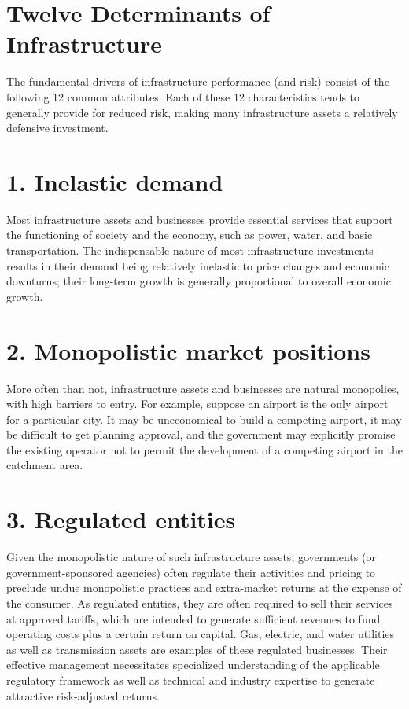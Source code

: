 \documentclass[11pt]{article}
\begin{document}
\section*{Twelve Determinants of Infrastructure}
The fundamental drivers of infrastructure performance (and risk) consist of the following 12 common attributes. Each of these 12 characteristics tends to generally provide for reduced risk, making many infrastructure assets a relatively defensive investment.

\section*{1. Inelastic demand}
Most infrastructure assets and businesses provide essential services that support the functioning of society and the economy, such as power, water, and basic transportation. The indispensable nature of most infrastructure investments results in their demand being relatively inelastic to price changes and economic downturns; their long-term growth is generally proportional to overall economic growth.

\section*{2. Monopolistic market positions}
More often than not, infrastructure assets and businesses are natural monopolies, with high barriers to entry. For example, suppose an airport is the only airport for a particular city. It may be uneconomical to build a competing airport, it may be difficult to get planning approval, and the government may explicitly promise the existing operator not to permit the development of a competing airport in the catchment area.

\section*{3. Regulated entities}
Given the monopolistic nature of such infrastructure assets, governments (or government-sponsored agencies) often regulate their activities and pricing to preclude undue monopolistic practices and extra-market returns at the expense of the consumer. As regulated entities, they are often required to sell their services at approved tariffs, which are intended to generate sufficient revenues to fund operating costs plus a certain return on capital. Gas, electric, and water utilities as well as transmission assets are examples of these regulated businesses. Their effective management necessitates specialized understanding of the applicable regulatory framework as well as technical and industry expertise to generate attractive risk-adjusted returns.
\end{document}
